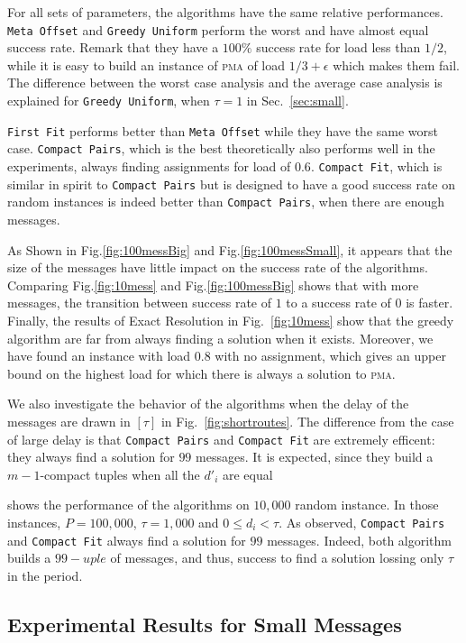 \documentclass[a4paper,cleveref, autoref, thm-restate,UKenglish]{lipics-v2019}
\newcommand\pma{\textsc{pma}\xspace}
\newcommand\firstfit{\texttt{First Fit}\xspace}
\newcommand\compactpair{\texttt{Compact Pairs}\xspace}
\newcommand\metaoffset{\texttt{Meta Offset}\xspace}
\newcommand\greedyuniform{\texttt{Greedy Uniform}\xspace}
\newcommand\compactfit{\texttt{Compact Fit}\xspace}
\begin{document}
For all sets of parameters, the algorithms have the same relative performances. \metaoffset and \greedyuniform
perform the worst and have almost equal success rate. Remark that they have a $100\%$ success rate for load
less than $1/2$, while it is easy to build an instance of \pma of load $1/3 +\epsilon$ which makes them fail. 
The difference between the worst case analysis and the average case analysis is explained for \greedyuniform, when $\tau = 1$ in Sec.~\ref{sec:small}.

\firstfit performs better than \metaoffset while they have the same worst case. \compactpair, which is the best theoretically also performs well in the experiments, always finding assignments for load of 
$0.6$.  \compactfit, which is similar in spirit to \compactpair but is designed to have a good success rate on random instances is indeed better than  \compactpair, when there are enough messages.

As Shown in Fig.\ref{fig:100messBig} and Fig.\ref{fig:100messSmall}, it appears that the size of the messages have little impact on the success rate of the algorithms. Comparing Fig.\ref{fig:10mess} and Fig.\ref{fig:100messBig} shows that with more messages, the transition between success rate of $1$ to a success rate of $0$ is faster.
Finally, the results of Exact Resolution in Fig.~\ref{fig:10mess} show that the greedy algorithm are far from always finding a solution when it exists. Moreover, we have found an instance with load $0.8$ with no assignment, which gives an upper bound on the highest load for which there is always a solution to \pma.

We also investigate the behavior of the algorithms when the delay of the messages are drawn in $[\tau]$ in 
Fig.~\ref{fig:shortroutes}. The difference from the case of large delay is that \compactpair and \compactfit are extremely efficent: they always find a solution for $99$ messages. It is expected, since they build a $m-1$-compact tuples when all the $d'_i$ are equal

 shows the performance of the algorithms on $10,000$ random instance. In those instances, $P = 100,000$, $\tau = 1,000$ and $0\leq d_i<\tau$. As observed, \compactpair and \compactfit always find a solution for $99$ messages. Indeed, both algorithm builds a $99-uple$ of messages, and thus, success to find a solution lossing only $\tau$ in the period.


\subsection{Experimental Results for Small Messages} \label{sec:perf_small}
\end{document}
